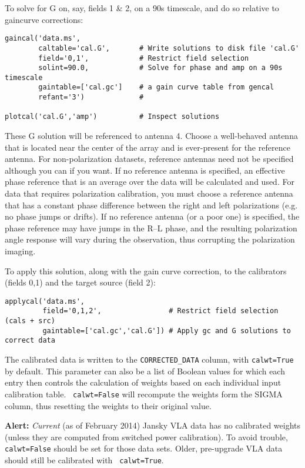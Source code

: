 To solve for G on, say, fields 1 \& 2, on a 90s timescale, and do so
relative to gaincurve corrections:
\small
\begin{verbatim}
gaincal('data.ms',
        caltable='cal.G',       # Write solutions to disk file 'cal.G'
        field='0,1',            # Restrict field selection
        solint=90.0,            # Solve for phase and amp on a 90s timescale
        gaintable=['cal.gc']    # a gain curve table from gencal
        refant='3')             #
			        
plotcal('cal.G','amp')          # Inspect solutions
\end{verbatim}
\normalsize

These G solution will be referenced to antenna 4.  Choose a
well-behaved antenna that is located near the center of the array and
is ever-present for the reference antenna.  For non-polarization
datasets, reference antennas need not be specified although you can if
you want.  If no reference antenna is specified, an effective phase
reference that is an average over the data will be calculated and
used.  For data that requires polarization calibration, you must
choose a reference antenna that has a constant phase difference
between the right and left polarizations (e.g. no phase jumps or
drifts).  If no reference antenna (or a poor one) is specified, the
phase reference may have jumps in the R--L phase, and the resulting
polarization angle response will vary during the observation, thus
corrupting the polarization imaging.

To apply this solution, along with the gain curve correction, to 
the calibrators (fields 0,1) and the target source (field
2):
\small
\begin{verbatim}
applycal('data.ms',
         field='0,1,2',                # Restrict field selection (cals + src)
         gaintable=['cal.gc','cal.G']) # Apply gc and G solutions to correct data
\end{verbatim}
\normalsize
The calibrated data is written to the {\tt CORRECTED\_DATA} column, with 
{\tt calwt=True} by default. This parameter can also be a list of
Boolean values for which each entry then controls the calculation of
weights based on each individual input calibration table. {\tt
  calwt=False} will recompute the weights form the SIGMA column, thus
resetting the weights to their original value.

{\bf Alert:} {\it Current} (as of February 2014) Jansky VLA data has
no calibrated weights (unless they are computed from switched power
calibration). To avoid trouble, {\tt calwt=False} should be set for
those data sets. Older, pre-upgrade VLA data should still be calibrated with {\tt
  calwt=True}.

